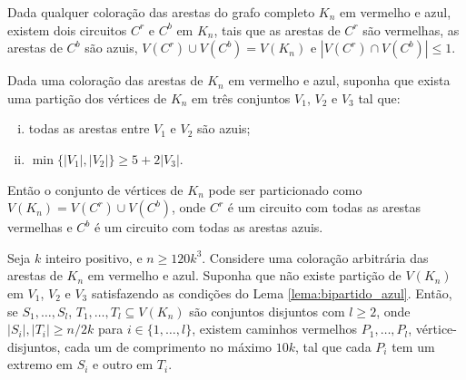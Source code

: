 \begin{lema}
	\label{gyarfas}
	Dada qualquer coloração das arestas do grafo completo $K_n$ em vermelho e azul, existem dois circuitos $C^r$ e $C^b$ em $K_n$, tais que as arestas de $C^r$ são vermelhas, as arestas de $C^b$ são azuis, $V(C^r)\cup V(C^b) = V(K_n)$ e $|V(C^r)\cap V(C^b)|\leq1$.
\end{lema}

\begin{lema}
	\label{lema:bipartido_azul}
	Dada uma coloração das arestas de $K_n$ em vermelho e azul, suponha que exista uma partição dos vértices de $K_n$ em três conjuntos $V_1$, $V_2$ e $V_3$ tal que:
	\begin{enumerate}[(i)]
		\item todas as arestas entre $V_1$ e $V_2$ são azuis;
		\item $\min\{|V_1|, |V_2|\}\geq 5 + 2|V_3|$.
	\end{enumerate}
	Então o conjunto de vértices de $K_n$ pode ser particionado como $V(K_n) = V(C^r)\cup V(C^b)$, onde $C^r$ é um circuito com todas as arestas vermelhas e $C^b$ é um circuito com todas as arestas azuis.
\end{lema}

\begin{fato}
	Seja $k$ inteiro positivo, e $n\geq 120k^3$. Considere uma coloração arbitrária das arestas de $K_n$ em vermelho e azul. Suponha que não existe partição de $V(K_n)$ em $V_1$, $V_2$ e $V_3$ satisfazendo as condições do Lema \ref{lema:bipartido_azul}. Então, se $S_1, \dots, S_l$, $T_1, \dots, T_l\subseteq V(K_n)$ são conjuntos disjuntos com $l\geq2$, onde $|S_i|, |T_i|\geq n/2k$ para $i\in \{1, \dots, l\}$, existem caminhos vermelhos $P_1, \dots, P_l$, vértice-disjuntos, cada um de comprimento no máximo $10k$, tal que cada $P_i$ tem um extremo em $S_i$ e outro em $T_i$.
\end{fato}

